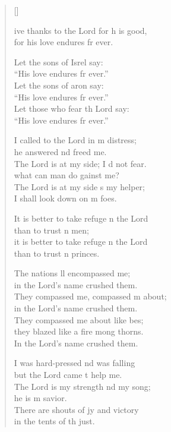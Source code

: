 \settowidth{\versewidth}{I shall not die, I shall live and recount his deeds.}
\begin{verse}[\versewidth]
  \begin{patverse}
    ive thanks to the Lord for h is good,\Med\\
    for his love endures fr ever.

    Let the sons of Isrel say:\Med\\
    “His love endures fr ever.”\\
    Let the sons of aron say:\Med\\
    “His love endures fr ever.”\\
    Let those who fear th Lord say:\Med\\
    “His love endures fr ever.”

    I called to the Lord in m distress;\Med\\
    he answered nd freed me.\\
    The Lord is at my side; I d not fear.\Med\\
    what can man do gainst me?\\
    The Lord is at my side s my helper;\Med\\
    I shall look down on m foes.

    It is better to take refuge \pointup{\i}n the Lord\Med\\
    than to trust \pointup{\i}n men;\\
    it is better to take refuge \pointup{\i}n the Lord\Med\\
    than to trust \pointup{\i}n princes.

    The nations ll encompassed me;\Med\\
    in the Lord’s name  crushed them.\\
    They compassed me, compassed m about;\Med\\
    in the Lord’s name  crushed them.\\
    They compassed me about like bes;\Flex\\
    they blazed like a fire mong thorns.\Med\\
    In the Lord’s name  crushed them.

    I was hard-pressed nd was falling\Med\\
    but the Lord came t help me.\\
    The Lord is my strength nd my song;\Med\\
    he is m savior.\\
    There are shouts of jy and victory\Med\\
    in the tents of th just.


\end{patverse}
\end{verse}
